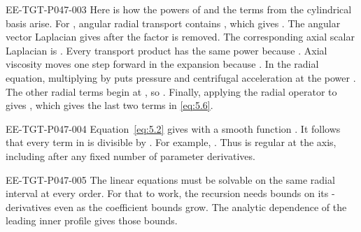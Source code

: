 \begin{EESegment}{EE-TGT-P047-003}
Here is how the powers of  and the terms from the cylindrical basis arise.
For , angular radial transport contains
, which gives
. The angular vector Laplacian gives
 after the factor
 is removed. The corresponding axial scalar
Laplacian is . Every transport product
has the same power because . Axial viscosity moves one step forward in
the  expansion because
. In the radial equation, multiplying by
 puts pressure and centrifugal acceleration at the power
. The other radial terms begin at
, so . Finally, applying the
radial operator  to
 gives
, which gives the last two terms in \eqref{eq:5.6}.
\end{EESegment}

\begin{EESegment}{EE-TGT-P047-004}
Equation~\eqref{eq:5.2} gives  with a smooth function
. It follows that every term in
 is divisible by . For example,
. Thus  is regular at the axis,
including after any fixed number of parameter derivatives.
\end{EESegment}

\begin{EESegment}{EE-TGT-P047-005}
The linear equations must be solvable on the same radial interval at every order. For that to work,
the recursion needs bounds on its -derivatives even as the coefficient
bounds grow. The analytic dependence of the leading inner profile gives those bounds.
\end{EESegment}

